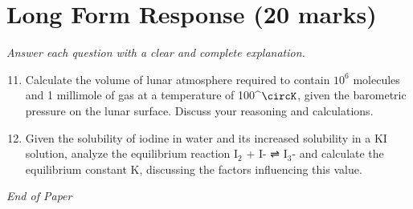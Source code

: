 \documentclass[12pt]{article}
\begin{document}
\section*{Long Form Response (20 marks)}
\textit{Answer each question with a clear and complete explanation.}
\begin{enumerate}[label=\arabic*.]
\setcounter{enumi}{10}
\item Calculate the volume of lunar atmosphere required to contain $10^6$ molecules and 1 millimole of gas at a temperature of 100^\ensuremath{\circK}, given the barometric pressure on the lunar surface. Discuss your reasoning and calculations.
\item Given the solubility of iodine in water and its increased solubility in a KI solution, analyze the equilibrium reaction I$_{2}$ + I- ⇌ I$_{3}$- and calculate the equilibrium constant K, discussing the factors influencing this value.
\end{enumerate}

\vfill
\noindent\textit{End of Paper}
\end{document}
